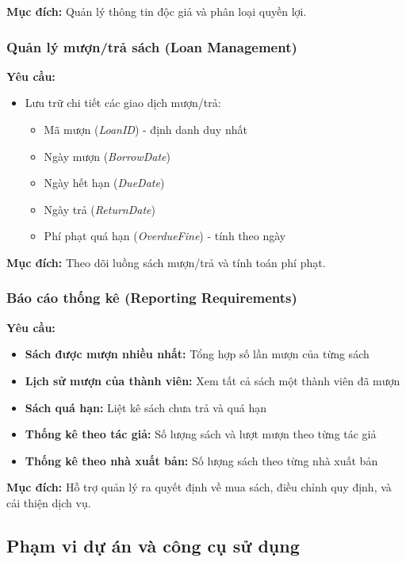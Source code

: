 \documentclass[12pt,a4paper]{article}
\newcommand{\attr}[1]{\textit{#1}}
\begin{document}
\textbf{Mục đích:} Quản lý thông tin độc giả và phân loại quyền lợi.

\subsubsection{Quản lý mượn/trả sách (Loan Management)}

\textbf{Yêu cầu:}
\begin{itemize}
    \item Lưu trữ chi tiết các giao dịch mượn/trả:
    \begin{itemize}
        \item Mã mượn (\attr{LoanID}) - định danh duy nhất
        \item Ngày mượn (\attr{BorrowDate})
        \item Ngày hết hạn (\attr{DueDate})
        \item Ngày trả (\attr{ReturnDate})
        \item Phí phạt quá hạn (\attr{OverdueFine}) - tính theo ngày
    \end{itemize}
\end{itemize}

\textbf{Mục đích:} Theo dõi luồng sách mượn/trả và tính toán phí phạt.

\subsubsection{Báo cáo thống kê (Reporting Requirements)}

\textbf{Yêu cầu:}
\begin{itemize}
    \item \textbf{Sách được mượn nhiều nhất:} Tổng hợp số lần mượn của từng sách
    \item \textbf{Lịch sử mượn của thành viên:} Xem tất cả sách một thành viên đã mượn
    \item \textbf{Sách quá hạn:} Liệt kê sách chưa trả và quá hạn
    \item \textbf{Thống kê theo tác giả:} Số lượng sách và lượt mượn theo từng tác giả
    \item \textbf{Thống kê theo nhà xuất bản:} Số lượng sách theo từng nhà xuất bản
\end{itemize}

\textbf{Mục đích:} Hỗ trợ quản lý ra quyết định về mua sách, điều chỉnh quy định, và cải thiện dịch vụ.

\subsection{Phạm vi dự án và công cụ sử dụng}
\end{document}
